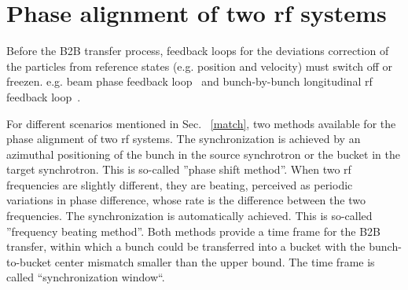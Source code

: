 \section{Phase alignment of two rf systems}
\label{two_sync_methods}

Before the B2B transfer process, feedback loops for the deviations correction of the particles from reference states (e.g. position and velocity) must switch off or freezen. e.g. beam phase feedback loop~\cite{grieser_beam_2015} and bunch-by-bunch longitudinal rf feedback loop~\cite{gross_bunch-by-bunch_2015}. 

For different scenarios mentioned in Sec. ~\ref{match}, two methods available for the phase alignment of two rf systems. The synchronization is achieved by an azimuthal positioning of the bunch in the source synchrotron or the bucket in the target synchrotron. This is so-called ''phase shift method''. When two rf frequencies are slightly different, they are beating, perceived as periodic variations in phase difference, whose rate is the difference between the two frequencies. The synchronization is automatically achieved. This is so-called ''frequency beating method''. Both methods provide a time frame for the B2B transfer, within which a bunch could be transferred into a bucket with the bunch-to-bucket center mismatch smaller than the upper bound. The time frame is called ``synchronization window``. 


